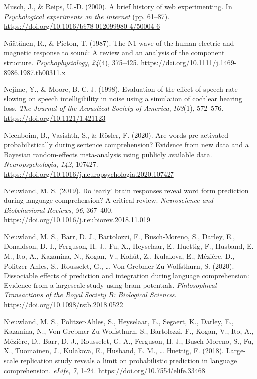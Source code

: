 \documentclass[a4paper, nobind]{templates/ociamthesis}
\newlength{\cslhangindent}
\newenvironment{CSLReferences}[2] %
 {%
  \setlength{\parindent}{0pt}
  \ifodd #1
  \let\oldpar\par
  \def\par{\hangindent=\cslhangindent\oldpar}
  \fi
  \setlength{\parskip}{1mm}
  \setlength{\baselineskip}{6mm}
 }%
 {}
\begin{document}
\begin{CSLReferences}{1}{0}
\leavevmode{}%
Musch, J., \& Reips, U.-D. (2000). {A brief history of web experimenting}. In \emph{Psychological experiments on the internet} (pp. 61--87). \url{https://doi.org/10.1016/b978-012099980-4/50004-6}

\leavevmode{}%
Näätänen, R., \& Picton, T. (1987). {The N1 wave of the human electric and magnetic response to sound: A review and an analysis of the component structure}. \emph{Psychophysiology}, \emph{24}(4), 375--425. \url{https://doi.org/10.1111/j.1469-8986.1987.tb00311.x}

\leavevmode{}%
Nejime, Y., \& Moore, B. C. J. (1998). {Evaluation of the effect of speech-rate slowing on speech intelligibility in noise using a simulation of cochlear hearing loss}. \emph{The Journal of the Acoustical Society of America}, \emph{103}(1), 572--576. \url{https://doi.org/10.1121/1.421123}

\leavevmode{}%
Nicenboim, B., Vasishth, S., \& Rösler, F. (2020). Are words pre-activated probabilistically during sentence comprehension? Evidence from new data and a Bayesian random-effects meta-analysis using publicly available data. \emph{Neuropsychologia}, \emph{142}, 107427. \url{https://doi.org/10.1016/j.neuropsychologia.2020.107427}

\leavevmode{}%
Nieuwland, M. S. (2019). {Do `early' brain responses reveal word form prediction during language comprehension? A critical review}. \emph{Neuroscience and Biobehavioral Reviews}, \emph{96}, 367--400. \url{https://doi.org/10.1016/j.neubiorev.2018.11.019}

\leavevmode{}%
Nieuwland, M. S., Barr, D. J., Bartolozzi, F., Busch-Moreno, S., Darley, E., Donaldson, D. I., Ferguson, H. J., Fu, X., Heyselaar, E., Huettig, F., Husband, E. M., Ito, A., Kazanina, N., Kogan, V., Kohút, Z., Kulakova, E., Mézière, D., Politzer-Ahles, S., Rousselet, G., \ldots{} Von Grebmer Zu Wolfsthurn, S. (2020). {Dissociable effects of prediction and integration during language comprehension: Evidence from a largescale study using brain potentials}. \emph{Philosophical Transactions of the Royal Society B: Biological Sciences}. \url{https://doi.org/10.1098/rstb.2018.0522}

\leavevmode{}%
Nieuwland, M. S., Politzer-Ahles, S., Heyselaar, E., Segaert, K., Darley, E., Kazanina, N., Von Grebmer Zu Wolfsthurn, S., Bartolozzi, F., Kogan, V., Ito, A., Mézière, D., Barr, D. J., Rousselet, G. A., Ferguson, H. J., Busch-Moreno, S., Fu, X., Tuomainen, J., Kulakova, E., Husband, E. M., \ldots{} Huettig, F. (2018). {Large-scale replication study reveals a limit on probabilistic prediction in language comprehension}. \emph{eLife}, \emph{7}, 1--24. \url{https://doi.org/10.7554/elife.33468}


\end{CSLReferences}
\end{document}
